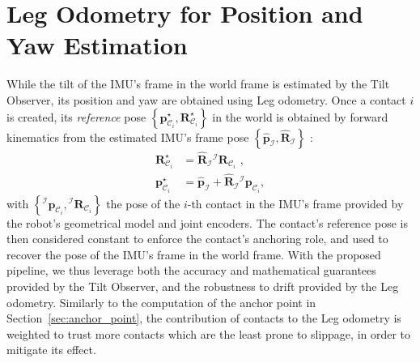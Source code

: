 \documentclass{IJCAS}
\begin{document}
\section{Leg Odometry for Position and Yaw Estimation} \label{sec:leg_odometry}

While the tilt of the IMU's frame in the world frame is estimated by the Tilt Observer, its position and yaw are obtained using Leg odometry. Once a contact $i$ is created, its \emph{reference} pose $\left\{ \boldsymbol{p}^{\star}_{\mathcal{C}_{i}}, \boldsymbol{R}^{\star}_{\mathcal{C}_{i}}\right\}$ in the world is obtained by forward kinematics from the estimated IMU's frame pose $\left\{ \hat{\boldsymbol{p}}_{\mathcal{I}}, \hat{\boldsymbol{R}}_{\mathcal{I}}\right\}$ :
\begin{align}
  \boldsymbol{R}^{\star}_{\mathcal{C}_{i}}  & = \hat{\boldsymbol{R}}_{\mathcal{I}}  {}^{\mathcal{I}} \boldsymbol{R}_{\mathcal{C}_{i}}  \text{ ,}\\
    \boldsymbol{p}^{\star}_{{\mathcal{C}}_{i}}   & = \hat{\boldsymbol{p}}_{\mathcal{I}} + \hat{\boldsymbol{R}}_{\mathcal{I}} {}^{\mathcal{I}}\boldsymbol{p}_{{\mathcal{C}}_{i}} ,
\end{align}
with $\left\{ {}^{\mathcal{I}}\boldsymbol{p}_{{\mathcal{C}}_{i}}, {}^{\mathcal{I}} \boldsymbol{R}_{\mathcal{C}_{i}} \right\}$ the pose of the $i$-th contact in the IMU's frame provided by the robot's geometrical model and joint encoders.
The contact's reference pose is then considered constant to enforce the contact's anchoring role, and used to recover the pose of the IMU's frame in the world frame. 
With the proposed pipeline, we thus leverage both the accuracy and mathematical guarantees provided by the Tilt Observer, and the robustness to drift provided by the Leg odometry. Similarly to the computation of the anchor point in Section~\ref{sec:anchor_point}, the contribution of contacts to the Leg odometry is weighted to trust more contacts which are the least prone to slippage, in order to mitigate its effect.
\end{document}
